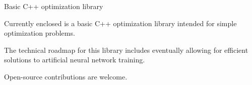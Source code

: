 Basic C++ optimization library

Currently enclosed is a basic C++ optimization library intended for simple optimization problems.

The technical roadmap for this library includes eventually allowing for efficient solutions to artificial neural network training.

Open-\/source contributions are welcome. 